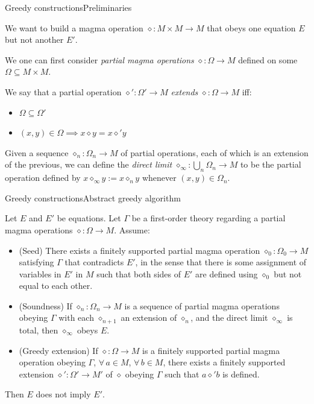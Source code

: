 \documentclass{beamer}
\newcommand{\op}{\diamond}
\begin{document}
\begin{frame}{Greedy constructions}{Preliminaries}

We want to build a magma operation $\op \colon M \times M \to M$ that obeys one equation $E$ but not another $E'$.

We one can first consider \emph{partial magma operations} $\op \colon \Omega \to M$ defined on some  $\Omega \subseteq M \times M$.

We say that a partial operation $\op' \colon \Omega' \to M$ \emph{extends} $\op \colon \Omega \to M$ iff:\!
\begin{itemize}
	\item $\Omega \subseteq \Omega'$
	\item $(x, y) \in \Omega \implies x \op y = x \op' y$
\end{itemize}

Given a sequence $\op_n \colon \Omega_n \to M$ of partial operations, each of which is an extension of the previous, we can define the \emph{direct limit} $\op_\infty \colon \bigcup_n \Omega_n \to M$ to be the partial operation defined by $x \op_\infty y := x \op_n y$ whenever $(x,y) \in \Omega_n$.

\end{frame}


\begin{frame}{Greedy constructions}{Abstract greedy algorithm}
	
Let $E$ and $E'$ be equations.
Let $\Gamma$ be a first-order theory regarding a partial magma operations $\op \colon \Omega \to M$.
Assume:
\begin{itemize}
	\item (Seed) There exists a finitely supported partial magma operation $\op_0 \colon \Omega_0 \to M$ satisfying $\Gamma$ that contradicts $E'$, in the sense that there is some assignment of variables in $E'$ in $M$ such that both sides of $E'$ are defined using $\op_0$ but not equal to each other.
	\item (Soundness) If $\op_n \colon \Omega_n \to M$ is a sequence of partial magma operations obeying $\Gamma$ with each $\op_{n+1}$ an extension of $\op_n$, and the direct limit $\op_\infty$ is total, then $\op_\infty$ obeys $E$.
	\item (Greedy extension) If $\op \colon \Omega \to M$ is a finitely supported partial magma operation obeying $\Gamma$, $\forall\, a \in M$, $\forall\, b \in M$, there exists a finitely supported extension $\op' \colon \Omega' \to M'$ of $\op$ obeying $\Gamma$ such that $a \op' b$ is defined.
\end{itemize}
Then $E$ does not imply $E'$.

\end{frame}
\end{document}
